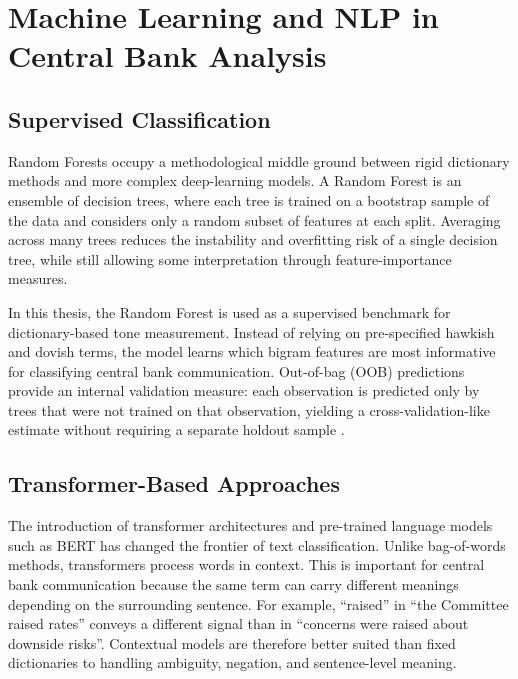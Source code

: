 \section{Machine Learning and NLP in Central Bank Analysis}
\label{sec:lit_ml}



\subsection{Supervised Classification}

Random Forests \citep{breiman2001} occupy a methodological middle
ground between rigid dictionary methods and more complex deep-learning
models. A Random Forest is an ensemble of decision trees, where each
tree is trained on a bootstrap sample of the data and considers only a
random subset of features at each split. Averaging across many trees
reduces the instability and overfitting risk of a single decision tree,
while still allowing some interpretation through feature-importance
measures.

In this thesis, the Random Forest is used as a supervised benchmark for
dictionary-based tone measurement. Instead of relying on pre-specified
hawkish and dovish terms, the model learns which bigram features are
most informative for classifying central bank communication. Out-of-bag
(OOB) predictions provide an internal validation measure: each
observation is predicted only by trees that were not trained on that
observation, yielding a cross-validation-like estimate without requiring
a separate holdout sample \citep{breiman2001}.

\subsection{Transformer-Based Approaches}
\label{sec:lit_transformers}

The introduction of transformer architectures \citep{vaswani2017} and
pre-trained language models such as BERT \citep{devlin2019} has changed
the frontier of text classification. Unlike bag-of-words methods,
transformers process words in context. This is important for central
bank communication because the same term can carry different meanings
depending on the surrounding sentence. For example, ``raised'' in
``the Committee raised rates'' conveys a different signal than in
``concerns were raised about downside risks''. Contextual models are
therefore better suited than fixed dictionaries to handling ambiguity,
negation, and sentence-level meaning.

